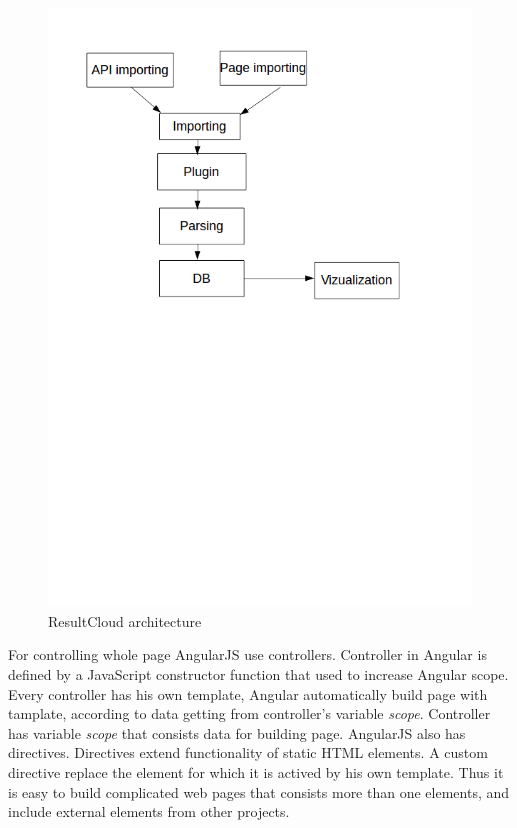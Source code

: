 \begin{figure}
  \centering
    \includegraphics[trim=0 13.41cm 0 0,scale=0.5]{fig/result-cloud.png}
  \caption{ResultCloud architecture}
  \label{fig:result_cloud}
\end{figure}

For controlling whole page AngularJS use controllers. Controller in Angular is defined by a JavaScript constructor function that used to increase Angular scope. Every controller has his own template, Angular automatically build page with tamplate, according to data getting from controller's variable \emph{scope}. Controller has variable \emph{scope} that consists data for building page. AngularJS also has directives. Directives extend functionality of static HTML elements. A custom directive replace the element for which it is actived by his own template. Thus it is easy to build complicated web pages that consists more than one elements, and include external elements from other projects.

